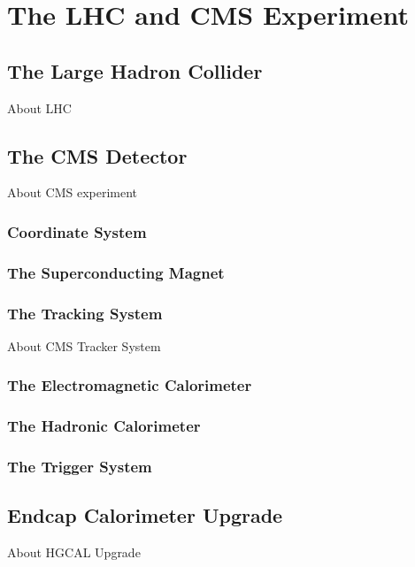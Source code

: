 \chapter{
  The LHC and CMS Experiment
 }\label{ch_cms}

\section{
  The Large Hadron Collider
 }\label{ch_cms:lhc}

About \gls{LHC}

\section{
  The CMS Detector
 }\label{ch_cms:cms}

About \gls{CMS} experiment

\subsection{
  Coordinate System
}

\subsection{
  The Superconducting Magnet
}

\subsection{
  The Tracking System
}

About \gls{CMS} Tracker System

\subsection{
  The Electromagnetic Calorimeter
}

\subsection{
  The Hadronic Calorimeter
}

\subsection{
  The Trigger System
}

\section{
  Endcap Calorimeter Upgrade
 }

About \gls{HGCAL} Upgrade
